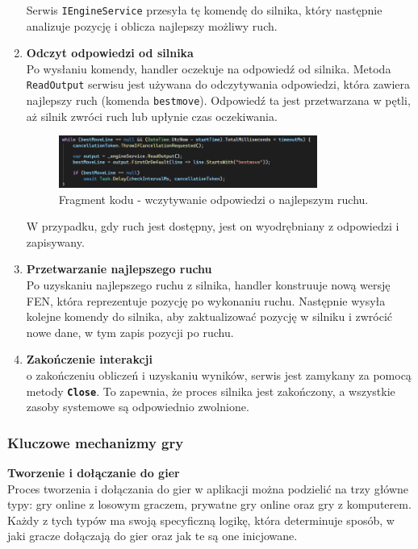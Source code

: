 \documentclass[12pt,a4paper]{article}
\begin{document}
\begin{enumerate}
    Serwis \texttt{IEngineService} przesyła tę komendę do silnika, który następnie analizuje pozycję i oblicza najlepszy możliwy ruch.

    \item \textbf{Odczyt odpowiedzi od silnika}\\
    Po wysłaniu komendy, handler oczekuje na odpowiedź od silnika. Metoda \texttt{ReadOutput} serwisu jest używana do odczytywania odpowiedzi, która zawiera najlepszy ruch (komenda \texttt{bestmove}). Odpowiedź ta jest przetwarzana w pętli, aż silnik zwróci ruch lub upłynie czas oczekiwania.
    
    \begin{figure}[h!]
        \centering
        \includegraphics[width=0.8\textwidth]{images/ex_read_output.png}
        \caption{Fragment kodu - wczytywanie odpowiedzi o najlepszym ruchu.}
    \end{figure}

    W przypadku, gdy ruch jest dostępny, jest on wyodrębniany z odpowiedzi i zapisywany.

    \item \textbf{Przetwarzanie najlepszego ruchu}\\
    Po uzyskaniu najlepszego ruchu z silnika, handler konstruuje nową wersję FEN, która reprezentuje pozycję po wykonaniu ruchu. Następnie wysyła kolejne komendy do silnika, aby zaktualizować pozycję w silniku i zwrócić nowe dane, w tym zapis pozycji po ruchu.

    \item \textbf{Zakończenie interakcji}\\
    o zakończeniu obliczeń i uzyskaniu wyników, serwis jest zamykany za pomocą metody \texttt{\textbf{Close}}. To zapewnia, że proces silnika jest zakończony, a wszystkie zasoby systemowe są odpowiednio zwolnione.
\end{enumerate}

\newpage

\subsubsection{Kluczowe mechanizmy gry}

\noindent \textbf{Tworzenie i dołączanie do gier}\\
Proces tworzenia i dołączania do gier w aplikacji można podzielić na trzy główne typy: gry online z losowym graczem, prywatne gry online oraz gry z komputerem. Każdy z tych typów ma swoją specyficzną logikę, która determinuje sposób, w jaki gracze dołączają do gier oraz jak te są one inicjowane.
\end{document}
